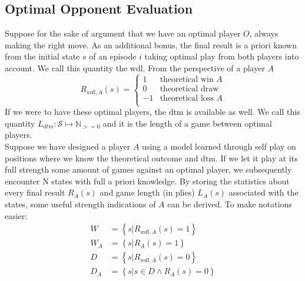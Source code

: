 \subsection{Optimal Opponent Evaluation}
\label{subsec:opt}

Suppose for the sake of argument that we have an optimal player $O$, always making the right move. As an additional bonus, the final result is a priori known from the initial state $s$ of an episode $i$ taking optimal play from both players into account. We call this quantity the \gls{wdl}. From the perspective of a player $A$ 
\begin{equation*}
R_{wdl,A}(s)=\begin{cases} 
1 & \text{theoretical win } A \\
0 & \text{theoretical draw} \\
-1 & \text{theoretical loss } A\\
\end{cases}
\end{equation*}
If we were to have these optimal players, the \acrlong{dtm} is available as well. We call this quantity $L_{dtm}:\mathcal{S}\mapsto\mathbb{N}_{>=0}$ and it is the length of a game between optimal players.\\

Suppose we have designed a player $A$ using a model learned through self play on positions where we know the theoretical outcome and \gls{dtm}. If we let it play at its full strength some amount of games against an optimal player, we subsequently encounter N states with full a priori knowledge. By storing the statistics about every final result $R_A(s)$ and game length (in plies) $L_A(s)$ associated with the states, some useful strength indications of $A$ can be derived. To make notations easier:
\begin{align*}
W&=\left\{s|R_{wdl,A}(s)=1\right\} \\
W_A&=\left\{s|R_{A}(s)=1\right\} \\
D&=\left\{s|R_{wdl,A}(s)=0\right\} \\
D_A&=\left\{s|s\in D \wedge R_{A}(s)=0\right\}
\end{align*}

